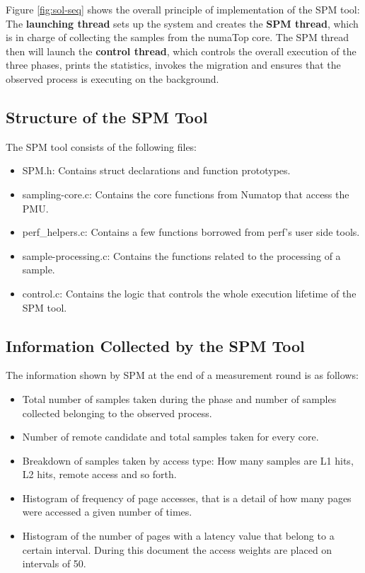Figure \ref{fig:sol-seq} shows the overall principle of implementation of the SPM tool: The \textbf{launching thread} sets up the system and creates the \textbf{SPM thread}, which is in charge of collecting the samples from the numaTop core. The SPM thread then will launch the \textbf{control thread}, which controls the overall execution of the three phases, prints the statistics, invokes the migration and ensures that the observed process is executing on the background.

\subsection{Structure of the SPM Tool}\label{subsection:spmstructr}

The SPM tool consists of the following files:
\begin{itemize}
	\item SPM.h: Contains struct declarations and function prototypes.
	\item sampling-core.c: Contains the core functions from Numatop that access the PMU.
		\item perf\_helpers.c: Contains a few functions borrowed from perf's user side tools.
	\item sample-processing.c: Contains the functions related to the processing of a sample.
	\item control.c: Contains the logic that controls the whole execution lifetime of the SPM tool.
\end{itemize}

\subsection{Information Collected by the SPM Tool}\label{subsection:spminf}

The information shown by SPM at the end of a measurement round is as follows:
\begin{itemize}
	\item Total number of samples taken during the phase and number of samples collected belonging to the observed process.
	\item Number of remote candidate and total samples taken for every core.
	\item Breakdown of samples taken by access type: How many samples are L1 hits, L2 hits, remote access and so forth.
	\item Histogram of frequency of page accesses, that is a detail of how many pages were accessed a given number of times.
	\item Histogram of the number of pages with a latency value that belong to a certain interval. During this document the access weights are placed on intervals of 50.
\end{itemize}

